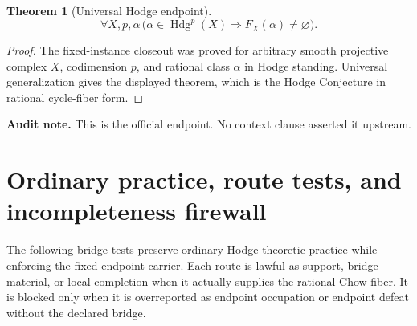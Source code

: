 \documentclass[11pt]{article}
\newtheorem{theorem}{Theorem}[section]
\newcommand{\Hdg}{\operatorname{Hdg}}
\begin{document}
\begin{theorem}[Universal Hodge endpoint]\label{thm:universal-hodge-endpoint}
\[
\forall X,p,\alpha\,\bigl(\alpha\in\Hdg^p(X)\Rightarrow F_X(\alpha)\neq\varnothing\bigr).
\]
\end{theorem}
\begin{proof}
The fixed-instance closeout was proved for arbitrary smooth projective complex $X$, codimension $p$, and rational class $\alpha$ in Hodge standing.  Universal generalization gives the displayed theorem, which is the Hodge Conjecture in rational cycle-fiber form.
\end{proof}
\par\noindent\textbf{Audit note.} This is the official endpoint.  No context clause asserted it upstream.


\section{Ordinary practice, route tests, and incompleteness firewall}

The following bridge tests preserve ordinary Hodge-theoretic practice while enforcing the fixed endpoint carrier. Each route is lawful as support, bridge material, or local completion when it actually supplies the rational Chow fiber. It is blocked only when it is overreported as endpoint occupation or endpoint defeat without the declared bridge.
\end{document}
